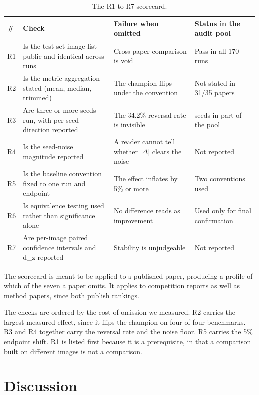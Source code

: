 \documentclass{interact}
\newlength{\tblavail}
\begin{document}
\begin{table}[tbp]
\centering
\footnotesize
\setlength{\tabcolsep}{3pt}
\setlength{\tblavail}{\dimexpr\textwidth-8\tabcolsep\relax}
\begin{tabular}{>{\centering\arraybackslash}m{0.038\tblavail}>{\centering\arraybackslash}m{0.384\tblavail}>{\centering\arraybackslash}m{0.321\tblavail}>{\centering\arraybackslash}m{0.227\tblavail}}
\hline
\# & Check & Failure when omitted & Status in the audit pool \\
\hline
R1 & Is the test-set image list public and identical across runs & Cross-paper comparison is void & Pass in all 170 runs \\
R2 & Is the metric aggregation stated (mean, median, trimmed) & The champion flips under the convention & Not stated in 31/35 papers \\
R3 & Are three or more seeds run, with per-seed direction reported & The 34.2\% reversal rate is invisible & 2 seeds in part of the pool \\
R4 & Is the seed-noise magnitude reported & A reader cannot tell whether $|$$\Delta$$|$ clears the noise & Not reported \\
R5 & Is the baseline convention fixed to one run and endpoint & The effect inflates by 5\% or more & Two conventions used \\
R6 & Is equivalence testing used rather than significance alone & No difference reads as improvement & Used only for final confirmation \\
R7 & Are per-image paired confidence intervals and d\_z reported & Stability is unjudgeable & Not reported \\
\hline
\end{tabular}
\caption{The R1 to R7 scorecard.}\label{tab:scorecard}
\end{table}

The scorecard is meant to be applied to a published paper, producing a profile of which of the seven a paper omits. It applies to competition reports as well as method papers, since both publish rankings.

The checks are ordered by the cost of omission we measured. R2 carries the largest measured effect, since it flips the champion on four of four benchmarks. R3 and R4 together carry the reversal rate and the noise floor. R5 carries the 5\% endpoint shift. R1 is listed first because it is a prerequisite, in that a comparison built on different images is not a comparison.

\section{Discussion}\label{sec:discussion}
\end{document}
